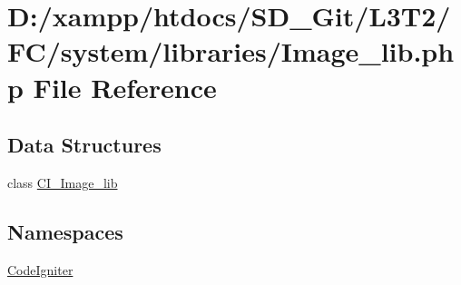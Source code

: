 \hypertarget{_image__lib_8php}{}\section{D\+:/xampp/htdocs/\+S\+D\+\_\+\+Git/\+L3\+T2/\+F\+C/system/libraries/\+Image\+\_\+lib.php File Reference}
\label{_image__lib_8php}
\subsection*{Data Structures}
\begin{DoxyCompactItemize}
\item 
class \hyperlink{class_c_i___image__lib}{C\+I\+\_\+\+Image\+\_\+lib}
\end{DoxyCompactItemize}
\subsection*{Namespaces}
\begin{DoxyCompactItemize}
\item 
 \hyperlink{namespace_code_igniter}{Code\+Igniter}
\end{DoxyCompactItemize}

